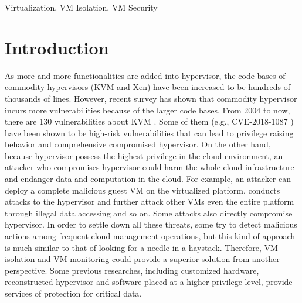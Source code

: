\documentclass[conference]{IEEEtran}
\begin{document}
\begin{IEEEkeywords}
Virtualization, VM Isolation, VM Security
\end{IEEEkeywords}

\section{Introduction}



As more and more functionalities are added into hypervisor, the code bases of commodity hypervisors (KVM and Xen) have been increased to be hundreds of thousands of lines. However, recent survey has shown that commodity hypervisor incurs more vulnerabilities because of the larger code bases. From 2004 to now, there are 130 vulnerabilities about KVM \cite{kvmcve}. Some of them (e.g., CVE-2018-1087 \cite{cve2018}) have been shown to be high-risk vulnerabilities that can lead to privilege raising behavior and comprehensive compromised hypervisor.
On the other hand, because hypervisor possess the highest privilege in the cloud environment, an attacker who 
compromises hypervisor could harm the whole cloud infrastructure and endanger data and computation in the cloud. For example, an attacker can deploy a complete malicious guest VM on the virtualized platform, conducts attacks to the hypervisor and further attack other VMs even the entire platform through illegal data accessing and so on. Some attacks also directly compromise hypervisor.
In order to settle down all these threats, some try to detect malicious actions among frequent cloud management operations, but this kind of approach is much similar to that of looking for a needle in a haystack. Therefore, VM isolation and VM monitoring could provide a superior solution from another perspective. 
Some previous researches, including customized hardware, reconstructed hypervisor and software placed at a higher privilege level, provide services of protection for critical data.
\end{document}

